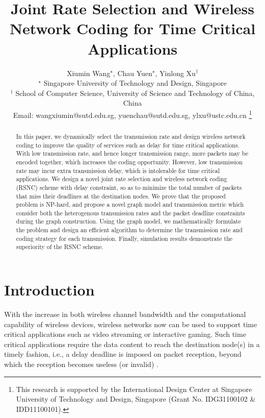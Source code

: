 \documentclass[journal]{IEEEtran}
\begin{document}
\title{Joint Rate Selection and Wireless Network Coding for Time Critical Applications}
\author{
\small Xiumin Wang$^\star$, Chau Yuen$^\star$, Yinlong Xu$^\dagger$\\
$^\star$ Singapore University of Technology and Design, Singapore\\
$^\dagger$ School of Computer Science, University of Science and Technology of China, China\\
\small Email: wangxiumin@sutd.edu.sg, yuenchau@sutd.edu.sg, ylxu@ustc.edu.cn
\thanks{This research is supported by the International Design Center at Singapore University of Technology and Design, Singapore (Grant No. IDG31100102 \& IDD11100101).}}
\maketitle

\begin{abstract}
In this paper, we  dynamically select the transmission rate and design wireless network coding to improve the quality of services such as delay for time critical applications.
With low transmission rate, and hence longer transmission range, more packets may be encoded together, which increases the coding opportunity. However, low transmission rate may incur extra transmission delay, which is intolerable for time critical applications.
We design a novel joint rate selection and wireless network coding (RSNC) scheme with delay constraint, so as to minimize the total number of packets that miss their deadlines at the destination nodes. We prove that the proposed problem is NP-hard, and propose a novel graph model and transmission metric which consider
both the heterogenous transmission rates and the packet deadline constraints during the graph construction. Using the graph model, we mathematically formulate the problem and design an efficient
algorithm to determine the transmission rate and coding strategy for each transmission. Finally, simulation results demonstrate the superiority of the RSNC scheme.
\end{abstract}

\vspace{-0.1in}
\section{Introduction}
With the increase in both wireless channel bandwidth and the computational capability of wireless devices, wireless networks
now can be used to support time critical applications such as video streaming or interactive gaming. Such time critical applications require the data content to reach the destination node(s) in a timely fashion, i.e., a delay deadline is imposed on packet reception, beyond which the reception becomes useless (or invalid) \cite{XTL2006Time-critical14}.
\end{document}
